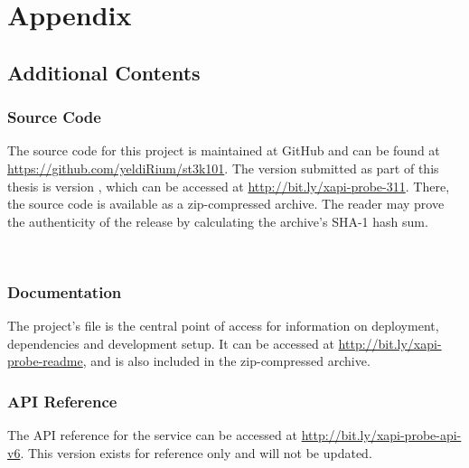 \section{Appendix}

    \subsection{Additional Contents}
	\subsubsection{Source Code}
	    The source code for this project is maintained at GitHub and can be found at
	    \url{https://github.com/yeldiRium/st3k101}.
	    The version submitted as part of this thesis is version , 
	    which can be accessed at \url{http://bit.ly/xapi-probe-311}. There, the
	    source code is available as a zip-compressed archive. The reader may
	    prove the authenticity of the release by calculating the archive's
	    SHA-1 hash sum. \\
	     
	     
	    \\[1em]

	\subsubsection{Documentation}
	    The project's  file is the central point of access for information on deployment,
	    dependencies and development setup.
	    It can be accessed at \url{http://bit.ly/xapi-probe-readme}, and is also included
	    in the zip-compressed archive.

	\subsubsection{API Reference}
	    The API reference for the  service can be accessed
	    at \url{http://bit.ly/xapi-probe-api-v6}. This version exists
	    for reference only and will not be updated.

	\pagebreak
	
    
    \pagebreak
    